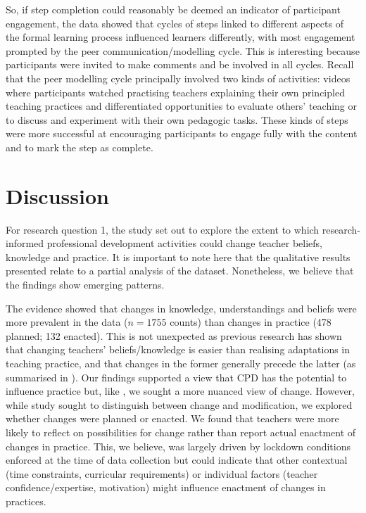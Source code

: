\documentclass[output=paper]{langscibook}
\begin{document}
So, if step completion could reasonably be deemed an indicator of participant engagement, the data showed that cycles of steps linked to different aspects of the formal learning process influenced learners differently, with most engagement prompted by the peer communication/modelling cycle. This is interesting because participants were invited to make comments and be involved in all cycles. Recall that the peer modelling cycle principally involved two kinds of activities: videos where participants watched practising teachers explaining their own principled teaching practices and differentiated opportunities to evaluate others’ teaching or to discuss and experiment with their own pedagogic tasks. These kinds of steps were more successful at encouraging participants to engage fully with the content and to mark the step as complete.

\section{Discussion}\label{sec:porter:4}\largerpage[-2]

\begin{sloppypar}
For research question 1, the study set out to explore the extent to which research-informed professional development activities could change teacher beliefs, knowledge and practice. It is important to note here that the qualitative results presented relate to a partial analysis of the dataset. Nonetheless, we believe that the findings show emerging patterns.
\end{sloppypar}

\begin{sloppypar}
The evidence showed that changes in knowledge, understandings and beliefs were more prevalent in the data ($n=1755$ counts) than changes in practice (478 planned; 132 enacted). This is not unexpected as previous research has shown that changing teachers’ beliefs/knowledge is easier than realising adaptations in teaching practice, and that changes in the former generally precede the latter (as summarised in \citealt{MacaroEtAl2015}). Our findings supported a view that CPD has the potential to influence practice but, like \citet{CabarogluRoberts2000}, we sought a more nuanced view of change. However, while study sought to distinguish between change and modification, we explored whether changes were planned or enacted. We found that teachers were more likely to reflect on possibilities for change rather than report actual enactment of changes in practice. This, we believe, was largely driven by lockdown conditions enforced at the time of data collection but could indicate that other contextual (time constraints, curricular requirements) or individual factors (teacher confidence/expertise, motivation) might influence enactment of changes in practices.
\end{sloppypar}
\end{document}
